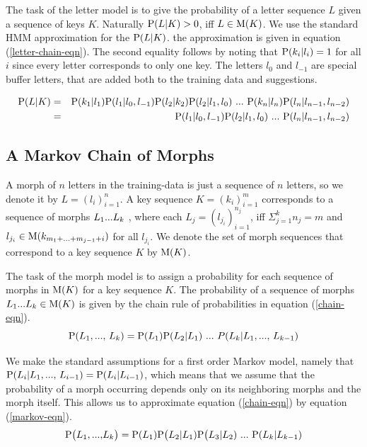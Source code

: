 \documentclass{llncs}
\begin{document}
The task of the letter model is to give the probability of a letter
sequence $L$ given a sequence of keys $K$. Naturally ${\rm P}(L|K) >
0$, iff $L \in {\rm M}(K)$. We use the standard HMM approximation for
the ${\rm P}(L|K)$. the approximation is given in equation
(\ref{letter-chain-eqn}).  The second equality follows by noting that
${\rm P}(k_i|l_i) = 1$ for all $i$ since every letter corresponds to
only one key. The letters $l_{0}$ and $l_{-1}$ are special buffer
letters, that are added both to the training data and suggestions.

\begin{eqnarray}\label{letter-chain-eqn}
{\rm P}(L|K) & = & {\rm P}(k_1|l_1){\rm P}(l_1|l_{0},l_{-1}){\rm
  P}(l_2|k_2){\rm P}(l_2|l_{1},l_{0}){\rm\ ...\ }{\rm P}(k_n|l_n){\rm
  P}(l_n|l_{n-1},l_{n-2})\\ & = & {\rm P}(l_1|l_{0},l_{-1}){\rm
  P}(l_2|l_{1},l_{0}){\rm\ ...\ }{\rm P}(l_n|l_{n-1},l_{n-2})
\end{eqnarray}

\subsection{A Markov Chain of Morphs}

A morph of $n$ letters in the training-data is just a sequence of $n$
letters, so we denote it by $L = (l_i)_{i=1}^{n}$. A key sequence $K =
(k_i)_{i=1}^{m}$ corresponds to a sequence of morphs $L_1{\rm
  ... }L_k$ , where each $L_j = (l_{j_i})_{i=1}^{n_j}$, iff $\Sigma_{j
  = 1}^{k} n_j = m$ and $l_{j_i} \in {\rm M}(k_{m_1 + {\rm ... } +
  m_{j - 1} + i})$ for all $l_{j_i}$. We denote the set of morph
sequences that correspond to a key sequence $K$ by ${\rm M}(K)$.

The task of the morph model is to assign a probability for each
sequence of morphs in ${\rm M}(K)$ for a key sequence $K$. The
probability of a sequence of morphs $L_1{\rm ... }L_k \in {\rm M}(K)$
is given by the chain rule of probabilities in equation
(\ref{chain-eqn}).
\begin{equation}\label{chain-eqn}
{\rm P}(L_1{\rm, ..., }\ L_k) = {\rm P}(L_1){\rm P}(L_2|L_1)\ {\rm
  ... }\ P(L_k| L_1{\rm, ..., }\ L_{k - 1})
\end{equation}

We make the standard assumptions for a first order Markov model,
namely that ${\rm P}(L_i | L_1{\rm, ..., }\ L_{i-1}) = {\rm P}(L_i |
L_{i-1})$, which means that we assume that the probability of a morph
occurring depends only on its neighboring morphs and the morph
itself. This allows us to approximate equation (\ref{chain-eqn}) by
equation (\ref{markov-eqn}).
\begin{equation}\label{markov-eqn}
{\rm P}\big(L_1{\rm, ..., }L_k\big) = {\rm P}(L_1){\rm P}\big(L_2 |
L_1){\rm P}\big(L_3 | L_2)\ {\rm ... }\ {\rm P}(L_{k} | L_{k-1})
\end{equation}
\end{document}

